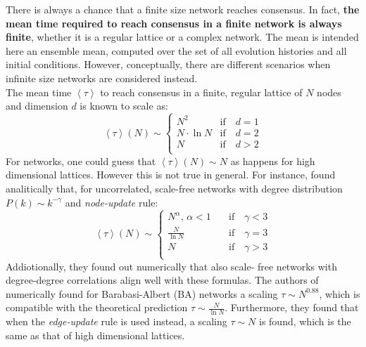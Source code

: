 There is always a chance that a finite size network reaches consensus. In fact, \textbf{the mean time required to reach consensus in a finite network is always finite}, whether it is a regular lattice or a complex network.  The mean is intended here an ensemble mean, computed over the set of all evolution histories and all initial conditions. However, conceptually, there are different scenarios when infinite size networks are considered instead.\\
The mean time $\left \langle \tau \right \rangle$ to reach consensus in a finite, regular lattice of $N$ nodes and dimension $d$ is known to scale as:
\begin{equation*}
    \left \langle \tau \right \rangle(N) \sim
    \begin{cases}
        N^2 \quad &\text{if}\quad d=1 \\
        N\cdot \ln{N} &\text{if}\quad d=2 \\
        N &\text{if}\quad d>2 \\
    \end{cases}
\end{equation*}
For networks, one could guess that $\left \langle \tau \right \rangle(N) \sim N$ as happens for high dimensional lattices. However this is not true in general. For instance, \cite{sood} found analitically that, for uncorrelated, scale-free networks with degree distribution $P(k)\sim k^{-\gamma}$ and \textit{node-update} rule:
\begin{equation*}
    \left \langle \tau \right \rangle(N) \sim
        \begin{cases}
         N^{\alpha}, \, \alpha<1 \quad &\text{if}\quad \gamma < 3 \\
        \frac{N}{\ln{N}} &\text{if}\quad \gamma = 3 \\
         N &\text{if}\quad \gamma > 3 \\
    \end{cases}
\end{equation*}
Addiotionally, they found out numerically that also scale- free networks with degree-degree correlations align well with these formulas. The authors of \cite{suchecki_numerical} numerically found for Barabasi-Albert (BA) networks a scaling $\tau \sim N^{0.88}$, which is compatible with the theoretical prediction $\tau \sim \frac{N}{\ln{N}}$. Furthermore, they found that when the \textit{edge-update} rule is used instead, a scaling $\tau \sim N$ is found, which is the same as that of high dimensional lattices. \\
